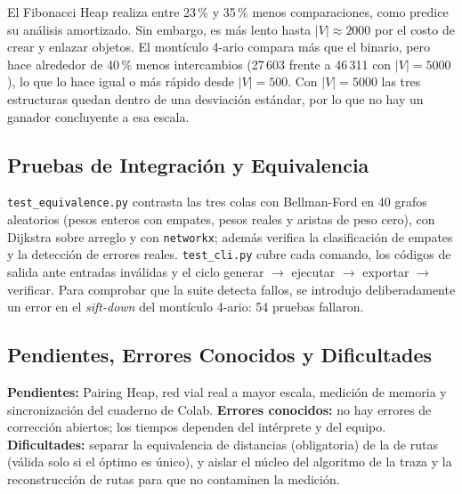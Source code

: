El Fibonacci Heap realiza entre 23\,\% y 35\,\% menos comparaciones, como predice su análisis amortizado. Sin embargo, es más lento hasta $|V| \approx 2000$ por el costo de crear y enlazar objetos. El montículo 4-ario compara más que el binario, pero hace alrededor de 40\,\% menos intercambios (27\,603 frente a 46\,311 con $|V|=5000$), lo que lo hace igual o más rápido desde $|V|=500$. Con $|V|=5000$ las tres estructuras quedan dentro de una desviación estándar, por lo que no hay un ganador concluyente a esa escala.

\subsection{Pruebas de Integración y Equivalencia}
\texttt{test\_equivalence.py} contrasta las tres colas con Bellman-Ford en 40 grafos aleatorios (pesos enteros con empates, pesos reales y aristas de peso cero), con Dijkstra sobre arreglo y con \texttt{networkx}; además verifica la clasificación de empates y la detección de errores reales. \texttt{test\_cli.py} cubre cada comando, los códigos de salida ante entradas inválidas y el ciclo generar $\to$ ejecutar $\to$ exportar $\to$ verificar. Para comprobar que la suite detecta fallos, se introdujo deliberadamente un error en el \textit{sift-down} del montículo 4-ario: 54 pruebas fallaron.

\subsection{Pendientes, Errores Conocidos y Dificultades}
\textbf{Pendientes:} Pairing Heap, red vial real a mayor escala, medición de memoria y sincronización del cuaderno de Colab. \textbf{Errores conocidos:} no hay errores de corrección abiertos; los tiempos dependen del intérprete y del equipo. \textbf{Dificultades:} separar la equivalencia de distancias (obligatoria) de la de rutas (válida solo si el óptimo es único), y aislar el núcleo del algoritmo de la traza y la reconstrucción de rutas para que no contaminen la medición.
